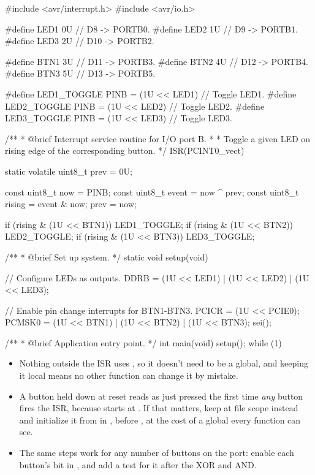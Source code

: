 \begin{ccode}
#include <avr/interrupt.h>
#include <avr/io.h>

#define LED1 0U // D8  -> PORTB0.
#define LED2 1U // D9  -> PORTB1.
#define LED3 2U // D10 -> PORTB2.

#define BTN1 3U // D11 -> PORTB3.
#define BTN2 4U // D12 -> PORTB4.
#define BTN3 5U // D13 -> PORTB5.

#define LED1_TOGGLE PINB = (1U << LED1) // Toggle LED1.
#define LED2_TOGGLE PINB = (1U << LED2) // Toggle LED2.
#define LED3_TOGGLE PINB = (1U << LED3) // Toggle LED3.

/**
 * @brief Interrupt service routine for I/O port B.
 *
 *        Toggle a given LED on rising edge of the corresponding button.
 */
ISR(PCINT0_vect)
{
    static volatile uint8_t prev = 0U;

    const uint8_t now    = PINB;
    const uint8_t event  = now ^ prev;
    const uint8_t rising = event & now;
    prev                 = now;

    if (rising & (1U << BTN1)) { LED1_TOGGLE; }
    if (rising & (1U << BTN2)) { LED2_TOGGLE; }
    if (rising & (1U << BTN3)) { LED3_TOGGLE; }
}

/**
 * @brief Set up system.
 */
static void setup(void)
{
    // Configure LEDs as outputs.
    DDRB = (1U << LED1) | (1U << LED2) | (1U << LED3);

    // Enable pin change interrupts for BTN1-BTN3.
    PCICR  = (1U << PCIE0);
    PCMSK0 = (1U << BTN1) | (1U << BTN2) | (1U << BTN3);
    sei();
}

/**
 * @brief Application entry point.
 */
int main(void)
{
    setup();
    while (1) {}
}
\end{ccode}

\note
\begin{itemize}
  \item Nothing outside the ISR uses , so it doesn't need to be a global, and keeping it
    local means no other function can change it by mistake.
  \item A button held down at reset reads as just pressed the first time \emph{any} button fires
    the ISR, because  starts at . If that matters, keep  at file
    scope instead and initialize it from  in , before , at the
    cost of a global every function can see.
  \item The same steps work for any number of buttons on the port: enable each button's bit in
    , and add a test for it after the XOR and AND.
\end{itemize}
